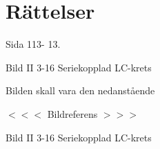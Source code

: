 \section{Rättelser}

\onecolumn

Sida 113- 13.

Bild II 3-16 Seriekopplad LC-krets

Bilden skall vara den nedanstående

$<<<$ Bildreferens $>>>$

Bild II 3-16 Seriekopplad LC-krets

\twocolumn